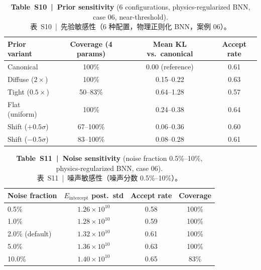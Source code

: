 \documentclass[11pt,a4paper]{article}
\newcommand{\Eint}{\ensuremath{E_{\mathrm{intercept}}}}
\begin{document}
\begin{table}[htbp]
\centering
\caption{\textbf{Table~S10~|~Prior sensitivity} (6 configurations,
physics-regularized BNN, case 06, near-threshold).\\
\small 表~S10~|~先验敏感性（6 种配置，物理正则化 BNN，案例 06）。}
\label{tab:S10}
\smallskip
\small
\begin{tabular}{lccc}
\toprule
Prior variant & Coverage (4 params) & Mean KL vs.\ canonical & Accept rate \\
\midrule
Canonical         & 100\%      & 0.00 (reference) & 0.61 \\
Diffuse ($2\times$)  & 100\%   & 0.15--0.22       & 0.63 \\
Tight ($0.5\times$)  & 50--83\% & 0.64--1.28      & 0.57 \\
Flat (uniform)    & 100\%      & 0.24--0.38       & 0.64 \\
Shift ($+0.5\sigma$) & 67--100\% & 0.06--0.36    & 0.60 \\
Shift ($-0.5\sigma$) & 83--100\% & 0.08--0.28    & 0.61 \\
\bottomrule
\end{tabular}
\end{table}

\begin{table}[htbp]
\centering
\caption{\textbf{Table~S11~|~Noise sensitivity} (noise fraction
0.5\%--10\%, physics-regularized BNN, case 06).\\
\small 表~S11~|~噪声敏感性（噪声分数 0.5\%--10\%）。}
\label{tab:S11}
\smallskip
\small
\begin{tabular}{lccc}
\toprule
Noise fraction & \Eint{} post.\ std & Accept rate & Coverage \\
\midrule
0.5\%            & $1.26\times10^{10}$ & 0.58 & 100\% \\
1.0\%            & $1.28\times10^{10}$ & 0.59 & 100\% \\
2.0\% (default)  & $1.32\times10^{10}$ & 0.61 & 100\% \\
5.0\%            & $1.36\times10^{10}$ & 0.63 & 100\% \\
10.0\%           & $1.40\times10^{10}$ & 0.65 &  83\% \\
\bottomrule
\end{tabular}
\end{table}

\end{document}
